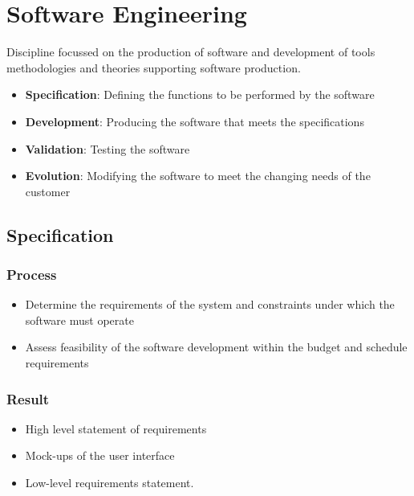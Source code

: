 \documentclass{article}
\begin{document}
\section{Software Engineering}

\begin{flushleft}
Discipline focussed on the production of software and development of tools methodologies and theories supporting software production.
\begin{itemize}
  \item \textbf{Specification}: Defining the functions to be performed by the software 
  \item \textbf{Development}: Producing the software that meets the specifications
  \item \textbf{Validation}: Testing the software
  \item \textbf{Evolution}: Modifying the software to meet the changing needs of the customer
\end{itemize}
\end{flushleft}

\subsection{Specification}

\subsubsection{Process}

\begin{itemize}
  \item Determine the requirements of the system and constraints under which the software must operate   
  \item Assess feasibility of the software development within the budget and schedule requirements
\end{itemize}

\subsubsection{Result}

\begin{itemize}
  \item High level statement of requirements 
  \item Mock-ups of the user interface 
  \item Low-level requirements statement.
\end{itemize}
\end{document}
